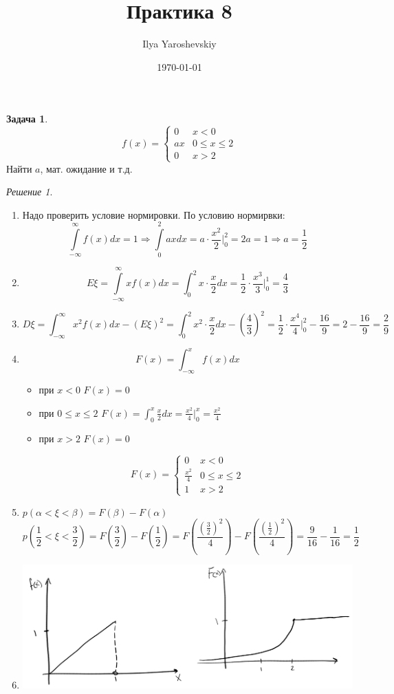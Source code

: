 \documentclass[english]{article}
\author{Ilya Yaroshevskiy}
\date{\today}
\title{Практика 8}
\theoremstyle{plain}
\theoremstyle{remark}
\newtheorem*{solution}{Решение}
\theoremstyle{definition}
\newtheorem{task}{Задача}
\begin{document}
\maketitle
\tableofcontents

\begin{task}
\[ f(x) = \begin{cases}
0 & x < 0 \\
ax & 0 \le x \le 2 \\
0 & x > 2
\end{cases}\]
Найти \(a\), мат. ожидание и т.д.
\end{task}
\begin{solution}
\begin{enumerate}
\item Надо проверить условие нормировки. По условию нормирвки:
\[ \int\limits_{-\infty}^\infty f(x) dx = 1 \Rightarrow \int\limits_0^2 ax dx = a\cdot \frac{x^2}{2} \bigg|_0^2 = 2a = 1 \Rightarrow a = \frac{1}{2}  \]
\item \[ E\xi = \int\limits_{- \infty}^\infty x f(x) dx = \int_0^2 x \cdot \frac{x}{2} dx = \frac{1}{2} \cdot \frac{x^3}{3} \bigg|_0^1 = \frac{4}{3} \]
\item \[ D\xi = \int_{ -\infty}^\infty x^2 f(x) dx - (E\xi)^2 = \int_0^2 x^2 \cdot \frac{x}{2} dx  - \left(\frac{4}{3}\right)^2 = \frac{1}{2} \cdot \frac{x^4}{4} \bigg|_0^2 - \frac{16}{9} = 2 - \frac{16}{9} = \frac{2}{9} \]
\item \[ F(x) = \int_{- \infty}^x f(x) dx \]
\begin{itemize}
\item при \(x < 0\) \(F(x) = 0\)
\item при \(0 \le x \le 2\) \(F(x) = \int_0^x \frac{x}{2} dx = \frac{x^2}{4}\bigg|_0^x = \frac{x^2}{4}\)
\item при \(x > 2\) \(F(x) = 0\)
\end{itemize}
\[ F(x) = \begin{cases}
   0 & x < 0 \\
   \frac{x^2}{4} & 0 \le x \le 2 \\
   1 & x > 2
   \end{cases} \]
\item \(p(\alpha < \xi < \beta) = F(\beta) - F(\alpha)\)
\[ p \left(\frac{1}{2} < \xi < \frac{3}{2}\right) = F \left(\frac{3}{2}\right)  - F \left(\frac{1}{2}\right) = F \left(\frac{\left(\frac{3}{2}\right)^2}{4}\right) - F \left(\frac{\left(\frac{1}{2}\right)^2}{4}\right) = \frac{9}{16} - \frac{1}{16} = \frac{1}{2}\]
\item \begin{center}
\includegraphics[scale=0.3]{8_1.png}
\end{center}
\end{enumerate}
\end{solution}
\end{document}
